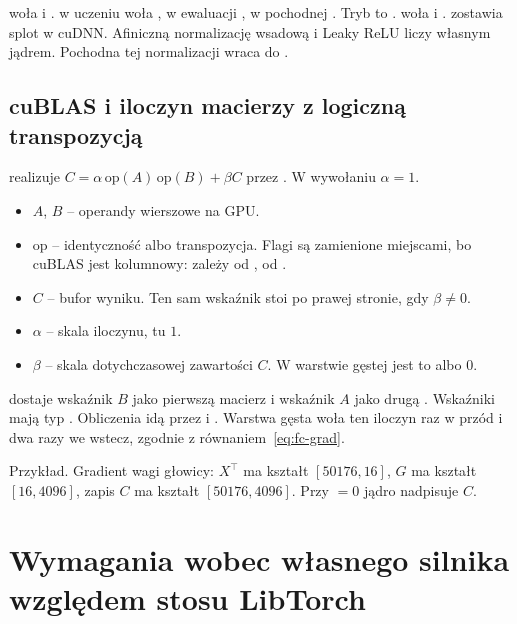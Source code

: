  woła  i .  w uczeniu woła , w ewaluacji , w pochodnej . Tryb to .  woła  i .  zostawia splot w cuDNN. Afiniczną normalizację wsadową i Leaky ReLU liczy własnym jądrem. Pochodna tej normalizacji wraca do .

\subsection{cuBLAS i iloczyn macierzy z logiczną transpozycją}

 realizuje \(C = \alpha \,\mathrm{op}(A)\,\mathrm{op}(B) + \beta C\) przez . W wywołaniu \(\alpha = 1\).
\begin{itemize}
\item \(A\), \(B\) -- operandy wierszowe na GPU.
\item \(\mathrm{op}\) -- identyczność albo transpozycja. Flagi są zamienione miejscami, bo cuBLAS jest kolumnowy:  zależy od ,  od .
\item \(C\) -- bufor wyniku. Ten sam wskaźnik stoi po prawej stronie, gdy \(\beta \neq 0\).
\item \(\alpha\) -- skala iloczynu, tu \(1\).
\item \(\beta\) -- skala dotychczasowej zawartości \(C\). W warstwie gęstej jest to  albo \(0\).
\end{itemize}

 dostaje wskaźnik \(B\) jako pierwszą macierz i wskaźnik \(A\) jako drugą \cite{nvidia-cublas}. Wskaźniki mają typ . Obliczenia idą przez  i . Warstwa gęsta woła ten iloczyn raz w przód i dwa razy we wstecz, zgodnie z równaniem~\eqref{eq:fc-grad}.

Przykład. Gradient wagi głowicy: \(X^{\top}\) ma kształt \([50176, 16]\), \(G\) ma kształt \([16, 4096]\), zapis \(C\) ma kształt \([50176, 4096]\). Przy  \(= 0\) jądro nadpisuje \(C\).

\section{Wymagania wobec własnego silnika względem stosu LibTorch}

